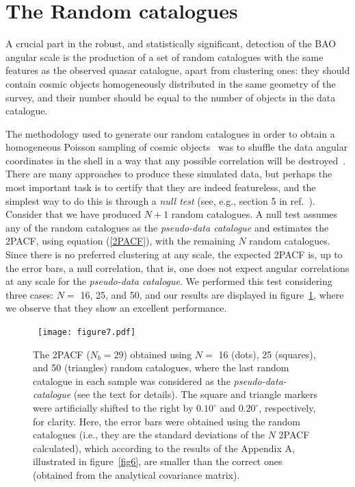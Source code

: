\documentclass[a4paper,11pt]{article}
\begin{document}
\section{The Random catalogues}

\noindent
A crucial part in the robust, and statistically significant, detection of the BAO angular scale is the 
production of a set of random catalogues with the same features as the observed quasar catalogue, apart from clustering ones: 
they should contain cosmic objects homogeneously distributed in the same geometry of the survey, and their number 
should be equal to the number of objects in the data catalogue. 

The methodology used to generate our random catalogues in order to obtain a homogeneous Poisson 
sampling of cosmic objects~\cite{Peebles-Hauser} was to shuffle the data angular coordinates in the shell in a way that any 
possible correlation will be destroyed~\cite{Rego}. 
There are many approaches to produce these simulated data, but perhaps the most important task is 
to certify that they are indeed featureless, and the simplest way to do this is through a {\it null test} (see, e.g., 
section 5 in ref.~\cite{Landy-Szalay}). 
Consider that we have produced $N+1$ random catalogues. 
A null test assumes any of the random catalogues as the {\it pseudo-data catalogue} and estimates the 
2PACF, using equation (\ref{2PACF}), with the remaining $N$ random catalogues. 
Since there is no preferred clustering at any scale, the expected 2PACF is, up to the error bars, 
a null correlation, that is, one does not expect angular correlations at any scale for the 
{\it pseudo-data catalogue}. 
We performed this test considering three cases: $N=$ 16, 25, and 50, and our results are displayed in 
figure~\ref{fig7}, where we observe that they show an excellent performance. 


\begin{figure}[h]
\centering
\mbox{\hspace{-0.2cm}
\texttt{[image: figure7.pdf]}
}
\caption{The 2PACF ($N_b = 29$) obtained using $N=$ 16 (dots), 25 (squares), and 50 (triangles) random catalogues, 
where the last random catalogue in each sample was considered as the {\it pseudo-data-catalogue} 
(see the text for details). 
The square and triangle markers were artificially shifted to the right by $0.10^{\circ}$ and $0.20^{\circ}$, 
respectively, for clarity. 
Here, the error bars were obtained using the random catalogues (i.e., they are the standard 
deviations of the $N$ 2PACF calculated), which according to the results of the Appendix A, illustrated 
in figure~\ref{fig6}, are smaller than the correct ones (obtained from the analytical covariance matrix).}
\label{fig7}
\end{figure}
\end{document}
